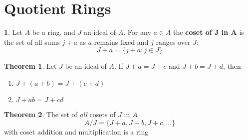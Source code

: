 \documentclass[a4paper,12pt]{article}
\theoremstyle{definition}
\newtheorem{definition}{}[section]
\theoremstyle{axiom}
\theoremstyle{theorem}
\newtheorem{theorem}{Theorem}[section]
\theoremstyle{lemma}
\begin{document}
\section{Quotient Rings}
\begin{definition}{}
        Let $A$ be a ring, and $J$ an ideal of $A$. For any $a \in A$ the \textbf{coset of J in A} is the set of all sums $j+a$ as $a$ remains fixed and $j$ ranges over $J$:
\begin{equation*}
        J + a = \{j + a: j \in J \}
\end{equation*}
\end{definition}
\begin{theorem}{}
    Let $J$ be an ideal of $A$. If $J+a=J+c$ and $J+b=J+d$, then
    \begin{enumerate}
            \item $J+(a+b)=J+(c+d)$
            \item $J+ab=J+cd$
    \end{enumerate}
\end{theorem}
\begin{theorem}{}
    The set of \textit{all} cosets of $J$ in $A$ 
        \begin{equation*}
            A/J = \{J+a, J+b, J+c, ...\}
        \end{equation*}
    with coset addition and multiplication is a ring
\end{theorem}
\end{document}
